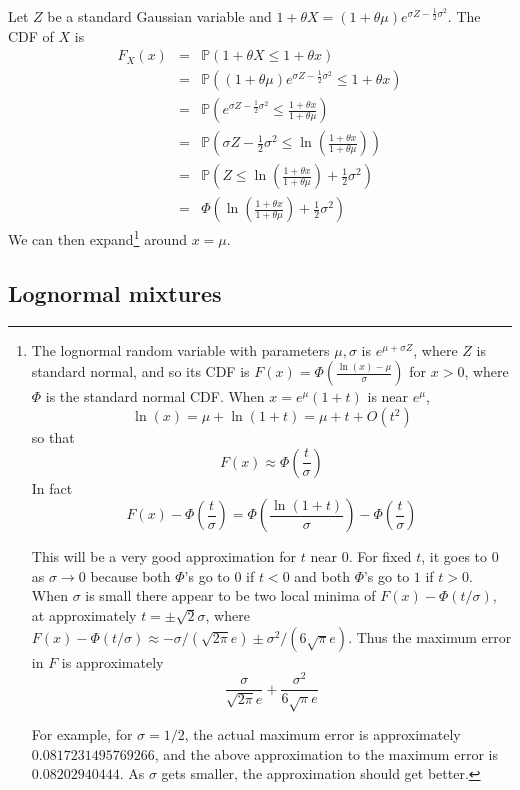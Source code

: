 \documentclass[11pt,english]{amsart}
\newcommand{\PP}{\mathbb{P}}
\theoremstyle{definition}
\begin{document}
Let $Z$ be a standard Gaussian variable and $1 + \theta X = (1+\theta \mu)e^{\sigma Z - \frac{1}{2}\sigma^2}$. The CDF of $X$ is 
\begin{eqnarray*}
  F_X(x)  &=& \PP\left( 1 + \theta X \le 1+\theta x \right) \\
  &=&  \PP\left( (1+\theta \mu)e^{\sigma Z - \frac{1}{2}\sigma^2} \le 1+\theta x \right) \\
  &=&  \PP\left( e^{\sigma Z - \frac{1}{2}\sigma^2} \le \frac{1+\theta x}{1+\theta \mu} \right) \\
  &=&  \PP\left( \sigma Z - \frac{1}{2}\sigma^2 \le \ln \left(\frac{1+\theta x}{1+\theta \mu} \right)  \right) \\
  &=&  \PP\left( Z \le \ln \left(\frac{1+\theta x}{1+\theta \mu} \right) + \frac{1}{2}\sigma^2   \right) \\
  &=&  \Phi\left( \ln \left(\frac{1+\theta x}{1+\theta \mu} \right) + \frac{1}{2}\sigma^2  \right) 
\end{eqnarray*}
We can then expand\footnote{
The lognormal random variable with parameters $\mu, \sigma$ is 
$e^{\mu + \sigma Z}$, where $Z$ is standard normal, and so its CDF is
$F(x) = \Phi\left(\frac{\ln(x) - \mu}{\sigma}\right)$ for $x > 0$, where $\Phi$ is
the standard normal CDF.  When $x = e^{\mu} (1+ t)$ is near $e^{\mu}$, 
$$\ln(x) = \mu + \ln(1 + t) = \mu + t  + O(t^2)$$
so that
$$F(x) \approx \Phi\left(\frac{t }{\sigma}\right)$$
In fact
    $$F(x) - \Phi\left(\frac{t }{\sigma}\right) = \Phi\left(\frac{\ln(1+t )}{\sigma}\right) - \Phi\left(\frac{t}{\sigma}\right) $$
    
This will be a very good approximation for $t$ near $0$. For fixed $t$, it
goes to $0$ as $\sigma \to 0$ because both $\Phi$'s go to  $0$ if $t < 0$
and both $\Phi$'s go to $1$ if $t > 0$.  When $\sigma$ is small there appear to be two local
minima of $F(x) - \Phi\left({t }/{\sigma}\right) $, at approximately
$t = \pm \sqrt{2} \sigma$, where
$F(x) - \Phi\left(t/\sigma\right) \approx  -\sigma/(\sqrt{2\pi} e) \pm
\sigma^2/(6 \sqrt{\pi} e)$.  Thus the maximum error in $F$ is
approximately $$ \frac{\sigma}{\sqrt{2\pi} e} + \frac{\sigma^2}{6 \sqrt{\pi} e}$$

For example, for $\sigma = 1/2$, the actual maximum error is approximately
$0.0817231495769266$, and the  above approximation to the maximum error is $0.08202940444$.
As $\sigma$ gets smaller, the approximation should get better. 
}
around $x = \mu$.

\subsection{Lognormal mixtures}
\end{document}
